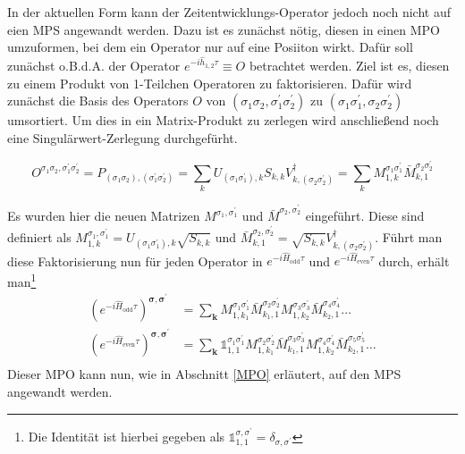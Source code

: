 \documentclass[10pt,a4paper]{report}
\begin{document}
In der aktuellen Form kann der Zeitentwicklungs-Operator jedoch noch nicht auf eien MPS angewandt werden. Dazu ist es zunächst nötig, diesen in einen MPO umzuformen, bei dem ein Operator nur auf eine Posiiton wirkt. Dafür soll zunächst o.B.d.A. der Operator $e^{-i\hat{h}_{1,2}\tau}\equiv O$ betrachtet werden. Ziel ist es, diesen zu einem Produkt von 1-Teilchen Operatoren zu faktorisieren. Dafür wird zunächst die Basis des Operators $O$ von $(\sigma_1\sigma_2,\sigma_1^{\prime}\sigma_2^{\prime})$ zu $(\sigma_1\sigma_1^{\prime},\sigma_2\sigma_2^{\prime})$ umsortiert. Um dies in ein Matrix-Produkt zu zerlegen wird anschließend noch eine Singulärwert-Zerlegung durchgefürht. 

\begin{equation}
O^{\sigma_1 \sigma_2,\sigma_1^\prime \sigma_2^\prime}=P_{(\sigma_1 \sigma_2),(\sigma_1^\prime \sigma_2^\prime)}=\sum_k U_{(\sigma_1 \sigma_1^\prime),k}S_{k,k}V_{k,(\sigma_2 \sigma_2^\prime)}^\dagger=\sum_k M_{1,k}^{\sigma_1 \sigma_1^\prime} \bar{M}_{k,1}^{\sigma_2 \sigma_2^\prime}
\end{equation}

Es wurden hier die neuen Matrizen $M^{\sigma_1,\sigma_1^{\prime}}$ und $\bar{M}^{\sigma_2,\sigma_2^{\prime}}$ eingeführt. Diese sind definiert als $M_{1,k}^{\sigma_1,\sigma_1^{\prime}}=U_{(\sigma_1 \sigma_1^\prime),k}\sqrt{S_{k,k}}$ und $\bar{M}_{k,1}^{\sigma_2,\sigma_2^{\prime}}=\sqrt{S_{k,k}}V_{k,(\sigma_2 \sigma_2^\prime)}^\dagger$. Führt man diese Faktorisierung nun für jeden Operator in $e^{-i\hat{H}_{\text{odd}}\tau}$ und $e^{-i\hat{H}_{\text{even}}\tau}$ durch, erhält man\footnote{Die Identität ist hierbei gegeben als $\mathbb{1}_{1,1}^{\sigma,\sigma^{\prime}}=\delta_{\sigma,\sigma^{\prime}}$}
\begin{equation}
\begin{split}
(e^{-i\hat{H}_{\text{odd}}\tau})^{\bm{\sigma},\bm{\sigma^\prime}}&=\sum_{\textbf{k}}M_{1,k_1}^{\sigma_1 \sigma_1^\prime} \bar{M}_{k_1,1}^{\sigma_2 \sigma_2^\prime}M_{1,k_2}^{\sigma_3 \sigma_3^\prime} \bar{M}_{k_2,1}^{\sigma_4 \sigma_4^\prime}\ldots\\
(e^{-i\hat{H}_{\text{even}}\tau})^{\bm{\sigma},\bm{\sigma^\prime}}&=\sum_{\textbf{k}}\mathbb{1}_{1,1}^{\sigma_1 \sigma_1^\prime} M_{1,k_1}^{\sigma_2 \sigma_2^\prime}\bar{M}_{k_1,1}^{\sigma_3 \sigma_3^\prime} M_{1,k_2}^{\sigma_4 \sigma_4^\prime}\bar{M}_{k_2,1}^{\sigma_5 \sigma_5^\prime}\ldots\\
\end{split}
\end{equation}
Dieser MPO kann nun, wie in Abschnitt \ref{MPO} erläutert, auf den MPS angewandt werden.
\end{document}
